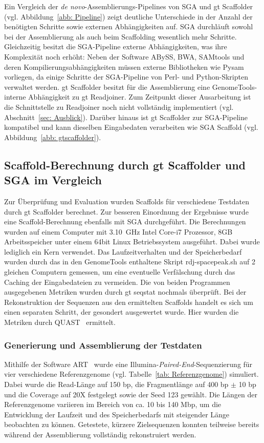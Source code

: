 \documentclass[a4paper,11pt,parskip]{scrartcl}
\begin{document}
Ein Vergleich der \textit{de novo}-Assemblierungs-Pipelines von SGA und gt
Scaffolder (vgl. Abbildung~\ref{abb: Pipeline}) zeigt deutliche Unterschiede
in der Anzahl der benötigten Schritte sowie externen Abhängigkeiten auf.
SGA durchläuft sowohl bei der Assemblierung als auch beim Scaffolding wesentlich
mehr Schritte. Gleichzeitig besitzt die SGA-Pipeline externe Abhängigkeiten,
was ihre Komplexität noch erhöht: Neben der Software ABySS, BWA, SAMtools und
deren Kompilierungsabhängigkeiten müssen externe Bibliotheken wie Pysam
vorliegen, da einige Schritte der SGA-Pipeline von Perl- und Python-Skripten
verwaltet werden.
gt Scaffolder besitzt für die Assemblierung eine GenomeTools-interne
Abhängigkeit zu gt Readjoiner. Zum Zeitpunkt dieser Ausarbeitung ist die
Schnittstelle zu Readjoiner noch nicht vollständig implementiert
(vgl. Abschnitt~\ref{sec: Ausblick}). Darüber hinaus ist gt Scaffolder zur
SGA-Pipeline kompatibel und kann dieselben Eingabedaten verarbeiten wie
SGA Scaffold (vgl. Abbildung~\ref{abb: gtscaffolder}).

\subsection{Scaffold-Berechnung durch gt Scaffolder und SGA im Vergleich}
Zur Überprüfung und Evaluation wurden Scaffolds für verschiedene Testdaten durch
gt Scaffolder berechnet. Zur besseren Einordnung der Ergebnisse wurde eine
Scaffold-Berechnung ebenfalls mit SGA durchgeführt. Die Berechnungen wurden auf
einem Computer mit 3.10~GHz Intel Core-i7 Prozessor, 8GB Arbeitsspeicher unter
einem 64bit Linux Betriebssystem ausgeführt. Dabei wurde lediglich ein Kern
verwendet. Das Laufzeitverhalten und der Speicherbedarf wurden durch das in den
GenomeTools enthaltene Skript rdj-spacepeak.sh auf 2 gleichen Computern
gemessen, um eine eventuelle Verfälschung durch das
Caching der Eingabedateien zu vermeiden. Die von beiden Programmen ausgegebenen
Metriken wurden durch gt seqstat nochmals überprüft. Bei der
Rekonstruktion der Sequenzen aus den ermittelten Scaffolds handelt es sich um
einen separaten Schritt, der gesondert ausgewertet wurde. Hier wurden die
Metriken durch QUAST~\cite{Gurevich:2013je} ermittelt.

\subsubsection*{Generierung und Assemblierung der Testdaten}
\label{sec: Testdaten}
Mithilfe der Software ART~\cite{Huang:2012kq} wurde eine
Illumina-\textit{Paired-End}-Sequenzierung für vier verschiedene Referenzgenome
(vgl. Tabelle~\ref{tab: Referenzgenome}) simuliert. Dabei wurde die Read-Länge
auf 150 bp, die Fragmentlänge auf 400 bp $\pm$ 10 bp und die Coverage auf
20X festgelegt sowie der Seed 123 gewählt. Die Längen der Referenzgenome
variieren im Bereich von ca. 10 bis 140 Mbp, um die Entwicklung der Laufzeit
und des Speicherbedarfs mit steigender Länge beobachten zu können.
Getestete, kürzere Zielsequenzen konnten teilweise bereits während der
Assemblierung vollständig rekonstruiert werden.
\end{document}
